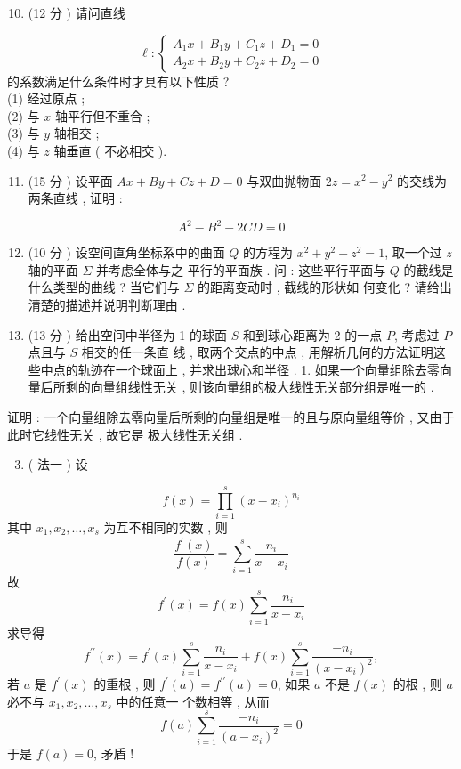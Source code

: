 \documentclass[10pt]{article}
\begin{document}
\begin{enumerate}
  \setcounter{enumi}{9}
  \item (12  分 )  请问直线 
\end{enumerate}
$$
\ell:\left\{\begin{array}{l}
A_{1} x+B_{1} y+C_{1} z+D_{1}=0 \\
A_{2} x+B_{2} y+C_{2} z+D_{2}=0
\end{array}\right.
$$
 的系数满足什么条件时才具有以下性质 ?\\
(1)  经过原点 ;\\
(2) 与  $x$  轴平行但不重合 ;\\
(3)  与  $y$  轴相交 ;\\
(4)  与  $z$  轴垂直  ( 不必相交 ).

\begin{enumerate}
  \setcounter{enumi}{10}
  \item (15  分 )  设平面  $A x+B y+C z+D=0$  与双曲抛物面  $2 z=x^{2}-y^{2}$  的交线为两条直线 ,  证明 :
\end{enumerate}
$$
A^{2}-B^{2}-2 C D=0
$$

\begin{enumerate}
  \setcounter{enumi}{11}
  \item (10  分 )  设空间直角坐标系中的曲面  $Q$  的方程为  $x^{2}+y^{2}-z^{2}=1$,  取一个过  $z$  轴的平面  $\Sigma$  并考虑全体与之   平行的平面族 .  问 :  这些平行平面与  $Q$  的截线是什么类型的曲线 ?  当它们与  $\Sigma$  的距离变动时 ,  截线的形状如   何变化 ?  请给出清楚的描述并说明判断理由 .

  \item (13  分 )  给出空间中半径为  1  的球面  $S$  和到球心距离为  2  的一点  $P$,  考虑过  $P$  点且与  $S$  相交的任一条直   线 ,  取两个交点的中点 ,  用解析几何的方法证明这些中点的轨迹在一个球面上 ,  并求出球心和半径 . 1.  如果一个向量组除去零向量后所剩的向量组线性无关 ,  则该向量组的极大线性无关部分组是唯一的 .

\end{enumerate}
 证明 :  一个向量组除去零向量后所剩的向量组是唯一的且与原向量组等价 ,  又由于此时它线性无关 ,  故它是   极大线性无关组 .

\begin{enumerate}
  \setcounter{enumi}{2}
  \item ( 法一 )  设 
\end{enumerate}
$$
f(x)=\prod_{i=1}^{s}\left(x-x_{i}\right)^{n_{i}}
$$
 其中  $x_{1}, x_{2}, \ldots, x_{s}$  为互不相同的实数 ,  则 
$$
\frac{f^{\prime}(x)}{f(x)}=\sum_{i=1}^{s} \frac{n_{i}}{x-x_{i}}
$$
 故 
$$
f^{\prime}(x)=f(x) \sum_{i=1}^{s} \frac{n_{i}}{x-x_{i}}
$$
 求导得 
$$
f^{\prime \prime}(x)=f^{\prime}(x) \sum_{i=1}^{s} \frac{n_{i}}{x-x_{i}}+f(x) \sum_{i=1}^{s} \frac{-n_{i}}{\left(x-x_{i}\right)^{2}},
$$
 若  $a$  是  $f^{\prime}(x)$  的重根 ,  则  $f^{\prime}(a)=f^{\prime \prime}(a)=0$,  如果  $a$  不是  $f(x)$  的根 ,  则  $a$  必不与  $x_{1}, x_{2}, \ldots, x_{s}$  中的任意一   个数相等 ,  从而 
$$
f(a) \sum_{i=1}^{s} \frac{-n_{i}}{\left(a-x_{i}\right)^{2}}=0
$$
 于是  $f(a)=0$,  矛盾 !
\end{document}
